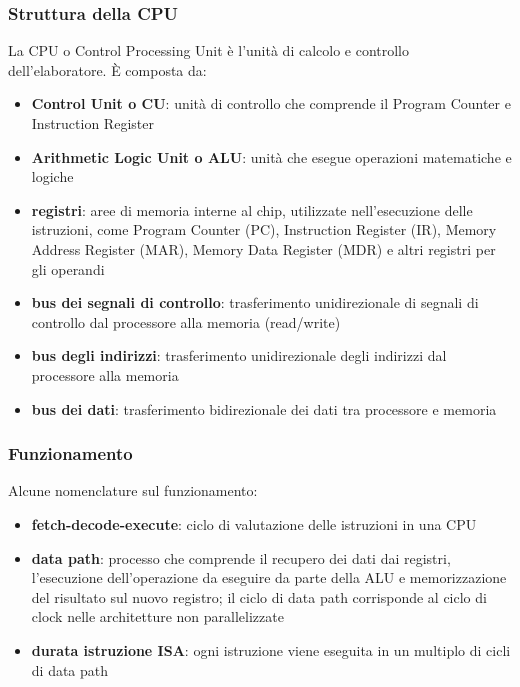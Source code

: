 \documentclass[a4paper]{article}
\begin{document}
\subsubsection*{Struttura della CPU}
La CPU o Control Processing Unit è l'unità di calcolo e controllo dell'elaboratore. È composta da:
\begin{itemize}
	\item \textbf{Control Unit o CU}: unità di controllo che comprende il Program Counter e Instruction Register
	\item \textbf{Arithmetic Logic Unit o ALU}: unità che esegue operazioni matematiche e logiche
	\item \textbf{registri}: aree di memoria interne al chip, utilizzate nell'esecuzione delle istruzioni, come Program Counter
	(PC), Instruction Register (IR), Memory Address Register (MAR), Memory Data Register (MDR) e altri registri per gli operandi
	\item \textbf{bus dei segnali di controllo}: trasferimento unidirezionale di segnali di controllo dal processore alla memoria (read/write)
	\item \textbf{bus degli indirizzi}: trasferimento unidirezionale degli indirizzi dal processore alla memoria
	\item \textbf{bus dei dati}: trasferimento bidirezionale dei dati tra processore e memoria
\end{itemize}

\subsubsection*{Funzionamento}
Alcune nomenclature sul funzionamento:
\begin{itemize}
	\item \textbf{fetch-decode-execute}: ciclo di valutazione delle istruzioni in una CPU
	\item \textbf{data path}: processo che comprende il recupero dei dati dai registri, l'esecuzione dell'operazione da eseguire
	da parte della ALU e memorizzazione del risultato sul nuovo registro; il ciclo di data path corrisponde al ciclo di clock nelle
	architetture non parallelizzate
	\item \textbf{durata istruzione ISA}: ogni istruzione viene eseguita in un multiplo di cicli di data path
\end{itemize}
\end{document}
